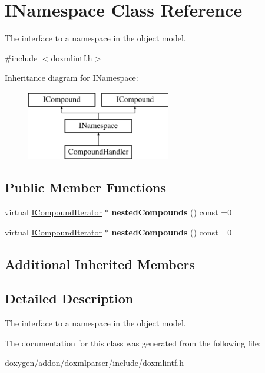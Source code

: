 \hypertarget{class_i_namespace}{}\section{I\+Namespace Class Reference}
\label{class_i_namespace}


The interface to a namespace in the object model.  




{\ttfamily \#include $<$doxmlintf.\+h$>$}

Inheritance diagram for I\+Namespace\+:\begin{figure}[H]
\begin{center}
\leavevmode
\includegraphics[height=3.000000cm]{class_i_namespace}
\end{center}
\end{figure}
\subsection*{Public Member Functions}
\begin{DoxyCompactItemize}
\item 
\mbox{\label{class_i_namespace_a1a639b94afa179d6a153d02e79d6c533}} 
virtual \mbox{\hyperlink{class_i_compound_iterator}{I\+Compound\+Iterator}} $\ast$ {\bfseries nested\+Compounds} () const =0
\item 
\mbox{\label{class_i_namespace_a1a639b94afa179d6a153d02e79d6c533}} 
virtual \mbox{\hyperlink{class_i_compound_iterator}{I\+Compound\+Iterator}} $\ast$ {\bfseries nested\+Compounds} () const =0
\end{DoxyCompactItemize}
\subsection*{Additional Inherited Members}


\subsection{Detailed Description}
The interface to a namespace in the object model. 

The documentation for this class was generated from the following file\+:\begin{DoxyCompactItemize}
\item 
doxygen/addon/doxmlparser/include/\mbox{\hyperlink{include_2doxmlintf_8h}{doxmlintf.\+h}}\end{DoxyCompactItemize}
